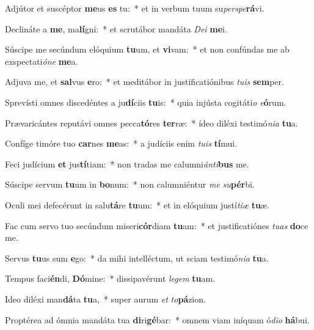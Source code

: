 \item Adjútor et suscéptor \textbf{me}us \textbf{es} tu:~* et in verbum tuum su\textit{per}\textit{spe}\textbf{rá}vi.
\item Declináte a \textbf{me}, ma\textbf{lí}gni:~* et scrutábor mandáta \textit{De}\textit{i} \textbf{me}i.
\item Súscipe me secúndum elóquium \textbf{tu}um, et \textbf{vi}vam:~* et non confúndas me ab exspectati\textit{ó}\textit{ne} \textbf{me}a.
\item Adjuva me, et \textbf{sal}vus \textbf{e}ro:~* et meditábor in justificatiónibus \textit{tu}\textit{is} \textbf{sem}per.
\item Sprevísti omnes discedéntes a ju\textbf{dí}ciis \textbf{tu}is:~* quia injústa cogitáti\textit{o} \textit{e}\textbf{ó}rum.
\item Prævaricántes reputávi omnes pecca\textbf{tó}res \textbf{ter}ræ:~* ídeo diléxi testimó\textit{ni}\textit{a} \textbf{tu}a.
\item Confíge timóre tuo \textbf{car}nes \textbf{me}as:~* a judíciis enim \textit{tu}\textit{is} \textbf{tí}mui.
\item Feci judícium \textbf{et} jus\textbf{tí}tiam:~* non tradas me calumni\textit{án}\textit{ti}\textbf{bus} me.
\item Súscipe servum \textbf{tu}um in \textbf{bo}num:~* non calumniéntur \textit{me} \textit{su}\textbf{pér}bi.
\item Oculi mei defecérunt in salu\textbf{tá}re \textbf{tu}um:~* et in elóquium justí\textit{ti}\textit{æ} \textbf{tu}æ.
\item Fac cum servo tuo secúndum miseri\textbf{cór}diam \textbf{tu}am:~* et justificatiónes \textit{tu}\textit{as} \textbf{do}ce me.
\item Servus \textbf{tu}us sum \textbf{e}go:~* da mihi intelléctum, ut sciam testimó\textit{ni}\textit{a} \textbf{tu}a.
\item Tempus faci\textbf{én}di, \textbf{Dó}mine:~* dissipavérunt \textit{le}\textit{gem} \textbf{tu}am.
\item Ideo diléxi man\textbf{dá}ta \textbf{tu}a,~* super aurum \textit{et} \textit{to}\textbf{pá}zion.
\item Proptérea ad ómnia mandáta tua \textbf{di}ri\textbf{gé}bar:~* omnem viam iníquam ó\textit{di}\textit{o} \textbf{há}bui.
